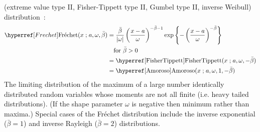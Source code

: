  (extreme value type II, Fisher-Tippett type II, Gumbel type II, inverse Weibull) distribution~\cite{Frechet1927,Gumbel1958}:
\begin{align}
\label{Frechet}
\Frechet(x \given a , \omega, \bar{\beta}) 
&=	\frac{\bar{\beta}}{| \omega |} \left(\frac{x-a }{\omega}\right)^{-\bar{\beta}-1} 
\exp\left\{-\left(\frac{x-a }{\omega}\right)^{-\bar{\beta}}\right\} \checked
\\ \notag &\quad \text{for } \bar{\beta}>0 \checked
\\  \notag
& = \opr{FisherTippett}(x\given  a, \omega, -\bar{\beta}) \checked
\\ \notag 
&= \opr{Amoroso}(x\given  a , \omega,1,-\bar{\beta})\notag \checked
\end{align}
The limiting distribution of the maximum of a large number identically distributed random variables whose moments are not all finite (i.e. heavy tailed distributions).  (If the shape parameter $\omega$ is negative then minimum rather than maxima.)
Special cases of the Fr\'{e}chet  distribution include the inverse exponential ($\bar{\beta}=1$) and inverse Rayleigh ($\bar{\beta}=2$) distributions.
 







